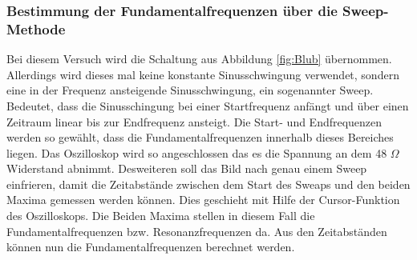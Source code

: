 \subsubsection{Bestimmung der Fundamentalfrequenzen über die Sweep-Methode}
Bei diesem Versuch wird die Schaltung aus Abbildung \ref{fig:Blub} übernommen. Allerdings wird dieses mal keine konstante Sinusschwingung verwendet, sondern eine in der Frequenz ansteigende Sinusschwingung, ein sogenannter Sweep. Bedeutet, dass die Sinusschingung bei einer Startfrequenz anfängt und über einen Zeitraum linear bis zur Endfrequenz ansteigt. Die Start- und Endfrequenzen werden so gewählt, dass die Fundamentalfrequenzen innerhalb dieses Bereiches liegen. Das Oszilloskop wird so angeschlossen das es die Spannung an dem 48 $\Omega$ Widerstand abnimmt. Desweiteren soll das Bild nach genau einem Sweep einfrieren, damit die Zeitabstände zwischen dem Start des Sweaps und den beiden Maxima gemessen werden können. Dies geschieht mit Hilfe der Cursor-Funktion des Oszilloskops. Die Beiden Maxima stellen in diesem Fall die Fundamentalfrequenzen bzw. Resonanzfrequenzen da. Aus den Zeitabständen können nun die Fundamentalfrequenzen berechnet werden.
